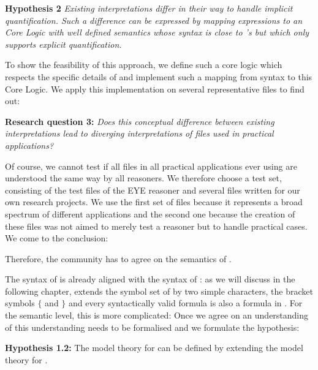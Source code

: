 \textbf{Hypothesis 2} \textit{ Existing interpretations differ in their way to handle implicit quantification. 
Such a difference can be expressed by mapping \nthree expressions to an \nthree Core Logic  with well defined semantics
whose syntax is close to \nthree's but which only supports explicit quantification.}

% 
% 
To show the feasibility of this approach, we define such a core logic which respects the specific details of \nthreelogic and implement such a mapping from \nthree syntax to this
\nthree Core Logic. We apply this implementation on several representative \nthree files to find out:

\textbf{Research question 3:} \textit{Does this conceptual difference between existing interpretations lead to diverging interpretations of files used in practical applications?} 

Of course, we cannot test if all \nthree files in all practical applications ever using \nthree are understood the same way by all reasoners. 
We therefore choose a test set, consisting of the test files of the EYE reasoner and several 
files written for our own research projects. We use the first set of files because it represents a broad spectrum of different applications and the second one because the creation 
of these files was not aimed to merely test a reasoner but to handle practical cases. We come to the conclusion:

Therefore, the community has to agree on the semantics of \nthreelogic.


The syntax of \nthree is already aligned with the syntax of \rdf: as we will discuss in the following chapter, \nthree extends the symbol set of \rdf by two simple characters,
the bracket symbols $\{$ and $\}$ and every syntactically valid \rdf formula is also a formula in \nthree.  For the semantic level, this is more complicated: 
Once we agree on an understanding of \nthreelogic this understanding needs to be formalised and we formulate the hypothesis:

\textbf{Hypothesis 1.2:}  The model theory for \nthree can be defined by extending the model theory for \rdf.

